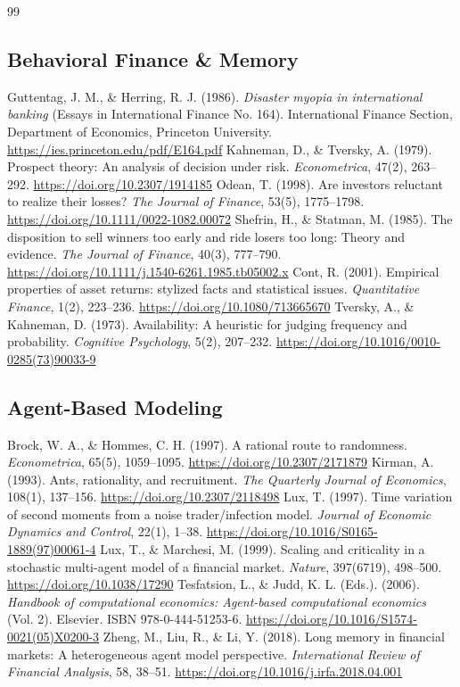 \documentclass[11pt]{article}
\begin{document}
\begin{thebibliography}{99}
\subsection{Behavioral Finance \& Memory}
 Guttentag, J. M., \& Herring, R. J. (1986). \textit{Disaster myopia in international banking} (Essays in International Finance No. 164). International Finance Section, Department of Economics, Princeton University. \url{https://ies.princeton.edu/pdf/E164.pdf}
 Kahneman, D., \& Tversky, A. (1979). Prospect theory: An analysis of decision under risk. \textit{Econometrica}, 47(2), 263--292. \url{https://doi.org/10.2307/1914185}
 Odean, T. (1998). Are investors reluctant to realize their losses? \textit{The Journal of Finance}, 53(5), 1775--1798. \url{https://doi.org/10.1111/0022-1082.00072}
 Shefrin, H., \& Statman, M. (1985). The disposition to sell winners too early and ride losers too long: Theory and evidence. \textit{The Journal of Finance}, 40(3), 777--790. \url{https://doi.org/10.1111/j.1540-6261.1985.tb05002.x}
 Cont, R. (2001). Empirical properties of asset returns: stylized facts and statistical issues. \textit{Quantitative Finance}, 1(2), 223--236. \url{https://doi.org/10.1080/713665670}
 Tversky, A., \& Kahneman, D. (1973). Availability: A heuristic for judging frequency and probability. \textit{Cognitive Psychology}, 5(2), 207--232. \url{https://doi.org/10.1016/0010-0285(73)90033-9}
\subsection{Agent-Based Modeling}
 Brock, W. A., \& Hommes, C. H. (1997). A rational route to randomness. \textit{Econometrica}, 65(5), 1059--1095. \url{https://doi.org/10.2307/2171879}
 Kirman, A. (1993). Ants, rationality, and recruitment. \textit{The Quarterly Journal of Economics}, 108(1), 137--156. \url{https://doi.org/10.2307/2118498}
 Lux, T. (1997). Time variation of second moments from a noise trader/infection model. \textit{Journal of Economic Dynamics and Control}, 22(1), 1--38. \url{https://doi.org/10.1016/S0165-1889(97)00061-4}
 Lux, T., \& Marchesi, M. (1999). Scaling and criticality in a stochastic multi-agent model of a financial market. \textit{Nature}, 397(6719), 498--500. \url{https://doi.org/10.1038/17290}
 Tesfatsion, L., \& Judd, K. L. (Eds.). (2006). \textit{Handbook of computational economics: Agent-based computational economics} (Vol. 2). Elsevier. ISBN 978-0-444-51253-6. \url{https://doi.org/10.1016/S1574-0021(05)X0200-3}
 Zheng, M., Liu, R., \& Li, Y. (2018). Long memory in financial markets: A heterogeneous agent model perspective. \textit{International Review of Financial Analysis}, 58, 38--51. \url{https://doi.org/10.1016/j.irfa.2018.04.001}

\end{thebibliography}
\end{document}
